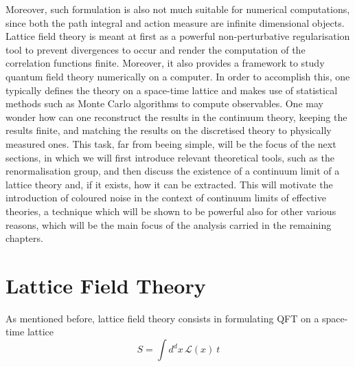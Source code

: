 Moreover, such formulation is also not much suitable for numerical computations, since both the path integral and action measure are infinite dimensional objects. \\
Lattice field theory \cite{Montvay1994QuantumLattice,rothe_LGT,gattringer_LQCD,creutz_2023} is meant at first as a powerful non-perturbative regularisation tool to prevent divergences to occur and render the computation of the correlation functions finite. Moreover, it also provides a framework to study quantum field theory numerically on a computer. In order to accomplish this, one typically defines the theory on a space-time lattice and makes use of statistical methods such as Monte Carlo algorithms to compute observables. One may wonder how can one reconstruct the results in the continuum theory, keeping the results finite, and matching the results on the discretised theory to physically measured ones. This task, far from beeing simple, will be the focus of the next sections, in which we will first introduce relevant theoretical tools, such as the renormalisation group, and then discuss the existence of a continuum limit of a lattice theory and, if it exists, how it can be extracted. This will motivate the introduction of coloured noise in the context of continuum limits of effective theories, a technique which will be shown to be powerful also for other various reasons, which will be the main focus of the analysis carried in the remaining chapters.

\section{Lattice Field Theory}
\label{sec:lattice_formulation}
As mentioned before, lattice field theory consists in formulating QFT on a space-time lattice
\begin{equation*}
	S = \int d^dx \, \mathcal{L}(x) \ t
\end{equation*}

